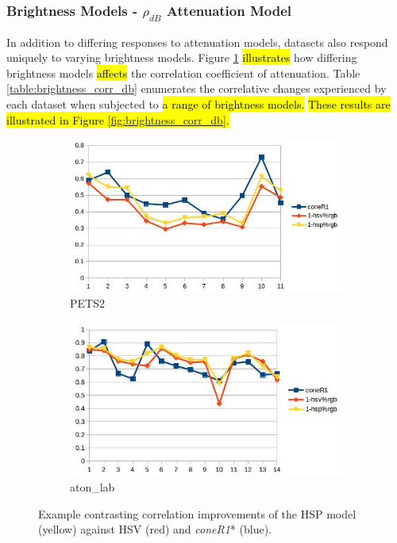 \documentclass[12pt]{report}
\begin{document}
\subsubsection{Brightness Models - $\rho_{dB}$ Attenuation Model}

In addition to differing responses to attenuation models, datasets also respond uniquely to varying brightness models. Figure \ref{fig:brightness_example} \hl{illustrates} how differing brightness models \hl{affects} the correlation coefficient of attenuation. Table \ref{table:brightness_corr_db} enumerates the correlative changes experienced by each dataset when subjected to \hl{a range of brightness models.} \hl{These results are illustrated in Figure \ref{fig:brightness_corr_db}.}

\begin{figure}
\centering
\begin{subfigure}{.49\linewidth}
  \includegraphics[width=1\linewidth]{figures/brightness/rgb/pets2_hsv_hsp.jpg}
  \caption{PETS2}
\end{subfigure}
\hfill
\begin{subfigure}{.49\linewidth}
  \includegraphics[width=1\linewidth]{figures/brightness/rgb/lab_hsv_hsp.jpg}
  \caption{aton\_lab}
\end{subfigure}

\caption{Example contrasting correlation improvements of the HSP model (yellow) against HSV (red) and \textit{coneR1}* (blue). }
\label{fig:brightness_example}
\end{figure}
\end{document}
